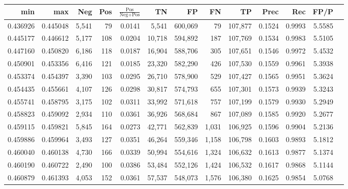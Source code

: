 \begin{tabular}{rrrrrrrrrrrrr}
\toprule
     min &      max &   Neg &   Pos & $\frac{\text{Pos}}{\text{Neg}+\text{Pos}}$ &      TN &      FP &      FN &      TP &   Prec &    Rec &   FP/P \\
\midrule
0.436926 & 0.445048 & 5,541 &    79 &                                     0.0141 &   5,541 & 600,069 &      79 & 107,877 & 0.1524 & 0.9993 & 5.5585 \\
0.445177 & 0.446612 & 5,177 &   108 &                                     0.0204 &  10,718 & 594,892 &     187 & 107,769 & 0.1534 & 0.9983 & 5.5105 \\
0.447160 & 0.450820 & 6,186 &   118 &                                     0.0187 &  16,904 & 588,706 &     305 & 107,651 & 0.1546 & 0.9972 & 5.4532 \\
0.450901 & 0.453356 & 6,416 &   121 &                                     0.0185 &  23,320 & 582,290 &     426 & 107,530 & 0.1559 & 0.9961 & 5.3938 \\
0.453374 & 0.454397 & 3,390 &   103 &                                     0.0295 &  26,710 & 578,900 &     529 & 107,427 & 0.1565 & 0.9951 & 5.3624 \\
0.454435 & 0.455661 & 4,107 &   126 &                                     0.0298 &  30,817 & 574,793 &     655 & 107,301 & 0.1573 & 0.9939 & 5.3243 \\
0.455741 & 0.458795 & 3,175 &   102 &                                     0.0311 &  33,992 & 571,618 &     757 & 107,199 & 0.1579 & 0.9930 & 5.2949 \\
0.458823 & 0.459092 & 2,934 &   110 &                                     0.0361 &  36,926 & 568,684 &     867 & 107,089 & 0.1585 & 0.9920 & 5.2677 \\
0.459115 & 0.459821 & 5,845 &   164 &                                     0.0273 &  42,771 & 562,839 &   1,031 & 106,925 & 0.1596 & 0.9904 & 5.2136 \\
0.459886 & 0.459964 & 3,493 &   127 &                                     0.0351 &  46,264 & 559,346 &   1,158 & 106,798 & 0.1603 & 0.9893 & 5.1812 \\
0.460040 & 0.460138 & 4,730 &   166 &                                     0.0339 &  50,994 & 554,616 &   1,324 & 106,632 & 0.1613 & 0.9877 & 5.1374 \\
0.460190 & 0.460722 & 2,490 &   100 &                                     0.0386 &  53,484 & 552,126 &   1,424 & 106,532 & 0.1617 & 0.9868 & 5.1144 \\
0.460879 & 0.461393 & 4,053 &   152 &                                     0.0361 &  57,537 & 548,073 &   1,576 & 106,380 & 0.1625 & 0.9854 & 5.0768 \\

\end{tabular}
